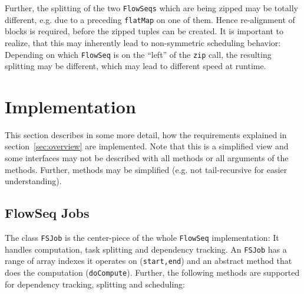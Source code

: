 \documentclass[runningheads,a4paper,fleqn]{llncs}
\begin{document}
Further, the splitting of the two \texttt{FlowSeqs} which are being zipped
may be totally different, e.g. due to a preceding \texttt{flatMap} on
one of them. Hence re-alignment of blocks is required,
before the zipped tuples can be created. It is important to realize,
that this may inherently lead to non-symmetric scheduling behavior:
Depending on which \texttt{FlowSeq} is on the ``left'' of the \texttt{zip}
call, the resulting splitting may be different, which may lead to
different speed at runtime. 

\section{Implementation}
\label{sec:implementation}

This section describes in some more detail, how the requirements
explained in section~\ref{sec:overview} are implemented. Note that
this is a simplified view and some interfaces may not be described
with all methods or all arguments of the methods. Further, methods may
be simplified (e.g. not tail-recursive for easier understanding).

\subsection{FlowSeq Jobs}
The class \texttt{FSJob} is the center-piece of the whole \texttt{FlowSeq}
implementation: It handles computation, task splitting and dependency
tracking. An \texttt{FSJob} has a range of array indexes it operates
on
(\texttt{start,end}) and an abstract method that does the computation
(\texttt{doCompute}). Further, the following methods are supported for
dependency tracking, splitting and scheduling:
\end{document}
